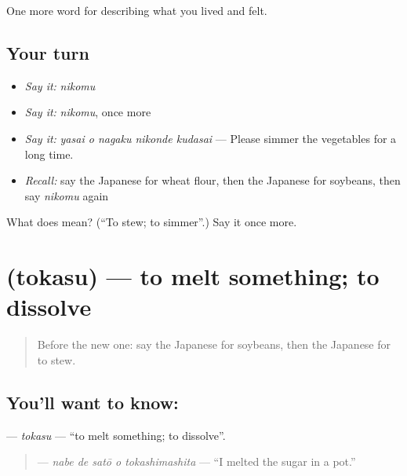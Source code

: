 \begin{grammarlens}[title={What you've built}]
One more word for describing what you lived and felt.
\end{grammarlens}

\subsection*{Your turn}
\begin{itemize}
\raggedright
  \item \emph{Say it:} \emph{nikomu}
  \item \emph{Say it:} \emph{nikomu}, once more
  \item \emph{Say it:} \emph{yasai o nagaku nikonde kudasai} — Please simmer the vegetables for a long time.
  \item \emph{Recall:} say the Japanese for wheat flour, then the Japanese for soybeans, then say \emph{nikomu} again
\end{itemize}

\begin{tcolorbox}[breakable,colback=teal!4,colframe=teal!35!black,title={Before you move on}]
What does  mean? (\textquotedblleft{}To stew; to simmer\textquotedblright{}.) Say it once more.
\end{tcolorbox}
\section[\texorpdfstring{\ja{とかす} (tokasu)}{とかす (tokasu)}]{ (tokasu) — to melt something; to dissolve}

\label{lesson:JA-C473-tokasu}



\begin{quote}
Before the new one: say the Japanese for soybeans, then the Japanese for to stew.
\end{quote}

\subsection*{You'll want to know: }
\textbf{} — \emph{tokasu} — \textquotedblleft{}to melt something; to dissolve\textquotedblright{}.

\begin{quote}
\textbf{  } — \emph{nabe de satō o tokashimashita} — \textquotedblleft{}I melted the sugar in a pot.\textquotedblright{}
\end{quote}

